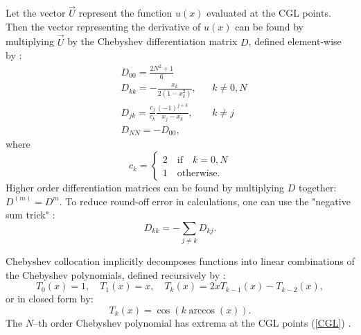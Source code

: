 \documentclass{sfuthesis}
\begin{document}
Let the vector $\vec{U}$ represent the function $u(x)$ evaluated at the CGL points.
Then the vector representing the derivative of $u(x)$ can be found by multiplying $\vec{U}$ by the Chebyshev differentiation matrix $D$, defined element-wise by \cite{mason2002chebyshev}:
\begin{equation} \label{diff matrix}
\begin{aligned}
& D_{00} = \frac{2N^2 + 1}{6} \\
& D_{kk} = - \frac{x_k}{2 ( 1-x^2_k )}, && k \neq 0,N \\
& D_{jk} = \frac{c_j}{c_k} \frac{ (-1)^{j+k}}{x_j - x_k}, && k \neq j \\
& D_{NN} = - D_{00}, \end{aligned}
\end{equation}
where
\begin{equation} \label{weights}
c_k = \begin{cases} 2 \quad \text{if} \quad k=0,N \\ 1 \quad \text{otherwise} . \end{cases}
\end{equation}
Higher order differentiation matrices can be found by multiplying $D$ together: $D^{(m)} = D^m$.
To reduce round-off error in calculations, one can use the "negative sum trick" \cite{BaT2003}:
\begin{equation}
D_{kk} = - \sum_{j \neq k} D_{kj} .
\end{equation}

Chebyshev collocation implicitly decomposes functions into linear combinations of the Chebyshev polynomials, defined recursively by \cite{mason2002chebyshev}:
\begin{equation} \label{Cheb poly}
T_0(x) = 1, \quad T_1(x) = x, \quad T_k(x) = 2xT_{k-1}(x) - T_{k-2}(x) ,
\end{equation}
or in closed form by:
\begin{equation} \label{closed form}
T_k(x) = \cos ( k \arccos (x) ) .
\end{equation}
The $N$--th order Chebyshev polynomial has extrema at the CGL points (\ref{CGL}) \cite{mason2002chebyshev}.
\end{document}

